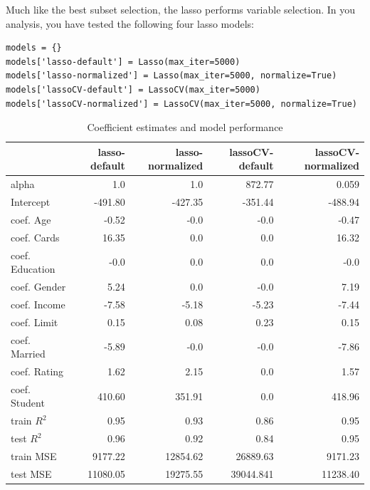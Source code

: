 \documentclass[addpoints,11pt]{exam}
\begin{document}
\begin{questions}
\begin{parts}



Much like the best subset selection, the lasso performs variable selection. In you analysis, you have tested the following four lasso models:
\begin{verbatim}
models = {}
models['lasso-default'] = Lasso(max_iter=5000)
models['lasso-normalized'] = Lasso(max_iter=5000, normalize=True)
models['lassoCV-default'] = LassoCV(max_iter=5000)
models['lassoCV-normalized'] = LassoCV(max_iter=5000, normalize=True)
\end{verbatim}

\begin{table}[h]
  \centering
  \caption{Coefficient estimates and model performance}\label{lasso_model}
\begin{tabular}{lrrrr}
  \hline
     & lasso-default & lasso-normalized & lassoCV-default & lassoCV-normalized\\
\hline
alpha &1.0 &1.0&872.77 & 0.059\\
Intercept &	-491.80 &	-427.35 &	-351.44 &	-488.94\\
coef. Age&-0.52& -0.0 & -0.0 & -0.47\\
coef. Cards&16.35&0.0&0.0&16.32\\
coef. Education&-0.0&0.0&0.0&-0.0\\
coef. Gender&5.24&0.0&-0.0&7.19\\
coef. Income&-7.58 &-5.18 &-5.23&-7.44\\
coef. Limit&0.15&0.08&0.23 &0.15\\
coef. Married&-5.89&-0.0&-0.0&-7.86\\
coef. Rating&1.62&2.15&0.0&1.57\\
coef. Student&410.60&351.91&0.0&418.96\\
train $R^2$&0.95&0.93&0.86&0.95\\
test $R^2$&0.96&0.92&0.84&0.95\\
train MSE&9177.22&12854.62&26889.63&9171.23\\
test MSE&11080.05&19275.55&39044.841&11238.40\\
\hline
\end{tabular}
\end{table}


\end{parts}
\end{questions}
\end{document}
